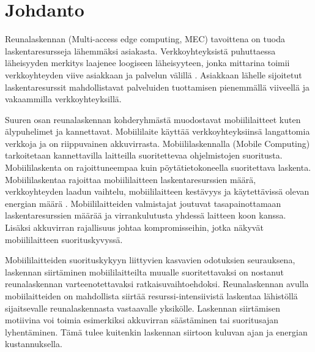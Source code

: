
\section{Johdanto}
Reunalaskennan (Multi-access edge computing, MEC) tavoittena on tuoda laskentaresursseja lähemmäksi asiakasta.
Verkkoyhteyksistä puhuttaessa läheisyyden merkitys laajenee loogiseen läheisyyteen, jonka mittarina toimii verkkoyhteyden viive asiakkaan ja palvelun välillä \cite{satyanarayanan2017emergence}.
Asiakkaan lähelle sijoitetut laskentaresurssit mahdollistavat palveluiden tuottamisen pienemmällä viiveellä ja vakaammilla verkkoyhteyksillä.



Suuren osan reunalaskennan kohderyhmästä muodostavat mobiililaitteet kuten älypuhelimet ja kannettavat. 
Mobiililaite käyttää verkkoyhteyksiinsä langattomia verkkoja ja on riippuvainen akkuvirrasta.
Mobiililaskennalla (Mobile Computing) tarkoitetaan kannettavilla laitteilla suoritettevaa ohjelmistojen suoritusta. 
Mobiililaskenta on rajoittuneempaa kuin pöytätietokoneella suoritettava laskenta. Mobiililaskentaa rajoittaa mobiililaitteen laskentaresurssien määrä, verkkoyhteyden laadun vaihtelu, mobiililaitteen kestävyys ja käytettävissä olevan energian määrä \cite{satya96}. 
Mobiililaitteiden valmistajat joutuvat tasapainottamaan laskentaresurssien määrää ja virrankulutusta yhdessä laitteen koon kanssa. Lisäksi akkuvirran rajallisuus johtaa kompromisseihin, jotka näkyvät mobiililaitteen suorituskyvyssä\cite{satya01pervasive}.

Mobiililaitteiden suorituskykyyn liittyvien kasvavien odotuksien seurauksena, laskennan siirtäminen mobiililaitteilta muualle suoritettavaksi on nostanut reunalaskennan varteenotettavaksi ratkaisuvaihtoehdoksi. Reunalaskennan avulla mobiilaitteiden on mahdollista siirtää resurssi-intensiivistä laskentaa lähistöllä sijaitsevalle reunalaskennasta vastaavalle yksikölle. 
Laskennan siirtämisen motiivina voi toimia esimerkiksi akkuvirran säästäminen tai suoritusajan lyhentäminen. Tämä tulee kuitenkin laskennan siirtoon kuluvan ajan ja energian kustannuksella. 

